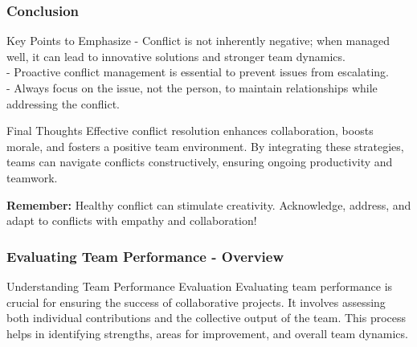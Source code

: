 \documentclass[aspectratio=169]{beamer}
\begin{document}
\begin{frame}[fragile]
    \frametitle{Conclusion}
    \begin{block}{Key Points to Emphasize}
        - Conflict is not inherently negative; when managed well, it can lead to innovative solutions and stronger team dynamics. \\
        - Proactive conflict management is essential to prevent issues from escalating. \\
        - Always focus on the issue, not the person, to maintain relationships while addressing the conflict.
    \end{block}

    \begin{block}{Final Thoughts}
        Effective conflict resolution enhances collaboration, boosts morale, and fosters a positive team environment. By integrating these strategies, teams can navigate conflicts constructively, ensuring ongoing productivity and teamwork.
    \end{block}

    \textbf{Remember:} Healthy conflict can stimulate creativity. Acknowledge, address, and adapt to conflicts with empathy and collaboration!
\end{frame}

\begin{frame}[fragile]
    \frametitle{Evaluating Team Performance - Overview}
    \begin{block}{Understanding Team Performance Evaluation}
        Evaluating team performance is crucial for ensuring the success of collaborative projects. It involves assessing both individual contributions and the collective output of the team. 
        This process helps in identifying strengths, areas for improvement, and overall team dynamics.
    \end{block}
\end{frame}
\end{document}
